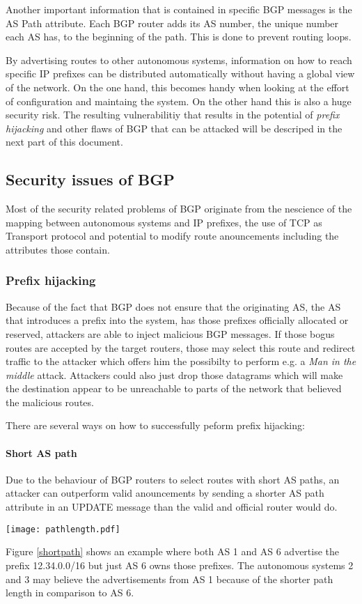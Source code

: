 \documentclass[12pt,a4paper]{IEEEtran}
\begin{document}
	Another important information that is contained in specific BGP messages is the  AS Path attribute. Each BGP router adds its AS number, the unique number each AS has, to the beginning of the path. This is done to prevent routing loops. 

	By advertising routes to other autonomous systems, information on how to reach specific IP prefixes can be distributed automatically without having a global view of the network. On the one hand, this becomes handy when looking at the effort of configuration and maintaing the system. On the other hand this is also a huge security risk.
	The resulting vulnerabilitiy that results in the potential of \emph{prefix hijacking} and other flaws of BGP that can be attacked will be descriped in the next part of this document. 
	
	\subsection{Security issues of BGP}
		Most of the security related problems of BGP originate from the nescience of the mapping between autonomous systems and IP prefixes, the use of TCP as Transport protocol and potential to modify route anouncements including the attributes those contain.

		\subsubsection{Prefix hijacking}
		Because of the fact that BGP does not ensure that the originating AS, the AS that introduces a prefix into the system, has those prefixes officially allocated or reserved, attackers are able to inject malicious BGP messages. 
		If those bogus routes are accepted by the target routers, those may select this route and redirect traffic to the attacker which offers him the possibilty to perform e.g. a \emph{Man in the middle} attack. Attackers could also just drop those datagrams which will make the destination appear to be unreachable to parts of the network that believed the malicious routes. 

		There are several ways on how to successfully peform prefix hijacking:
		\paragraph{Short AS path}
		Due to the behaviour of BGP routers to select routes with short AS paths, an attacker can outperform valid anouncements by sending a shorter AS path attribute in an UPDATE message than the valid and official router would do. 
		\begin{figure*}[ht!]
			\begin{center}
				\texttt{[image: pathlength.pdf]}
			\end{center}
			\caption{Prefix hijacking by shorter AS pathes}
			\label{shortpath}
		\end{figure*}
		Figure \ref{shortpath} shows an example where both AS 1 and AS 6 advertise the prefix 12.34.0.0/16 but just AS 6 owns those prefixes. The autonomous systems 2 and 3 may believe the advertisements from AS 1 because of the shorter path length in comparison to AS 6.
\end{document}
